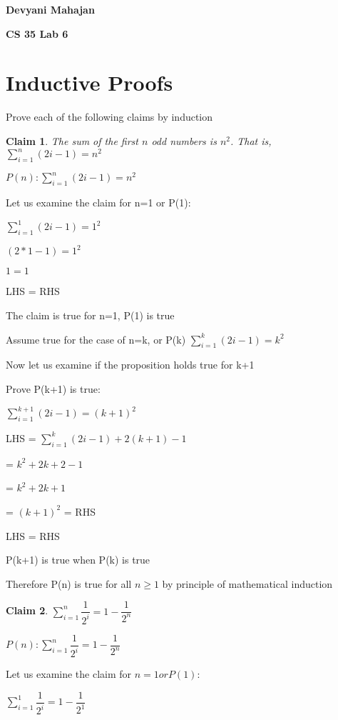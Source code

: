 \documentclass{article}
\newtheorem{claim}{Claim}
\begin{document}
\textbf{Devyani Mahajan}

\textbf{CS 35 Lab 6}
    \section{Inductive Proofs}

    Prove each of the following claims by induction

    \begin{claim}
      The sum of the first $n$ odd numbers is $n^2$.  That is, $\sum\limits_{i=1}^n (2i-1) = n^2$
    \end{claim}

	$P(n): \sum\limits_{i=1}^n (2i-1) = n^2$

    Let us examine the claim for n=1 or P(1):

    $\sum\limits_{i=1}^1 (2i-1) = 1^2$

    $(2*1 -1) = 1^2$

    $1 = 1$

    LHS = RHS

    The claim is true for n=1, P(1) is true


    Assume true for the case of n=k, or P(k)
    $\sum\limits_{i=1}^k (2i-1) = k^2$


    Now let us examine if the proposition holds true for k+1

    Prove P(k+1) is true:

    $\sum\limits_{i=1}^{k+1} (2i-1) = (k+1)^2$

    LHS = $\sum\limits_{i=1}^k (2i-1)+2(k+1)-1$

    = $k^2+2k+2-1$

    = $k^2+2k+1$

    = $(k+1)^2$ = RHS

    LHS = RHS

    P(k+1) is true when P(k) is true


    Therefore P(n) is true for all $n \geq 1$ by principle of mathematical induction



    \begin{claim}
      $\sum\limits_{i=1}^{n} \dfrac{1}{2^i} = 1 - \dfrac{1}{2^n}$
    \end{claim}

    $P(n): \sum\limits_{i=1}^{n} \dfrac{1}{2^i} = 1 - \dfrac{1}{2^n}$

    Let us examine the claim for $n=1 or P(1):$
    
    $\sum\limits_{i=1}^{1} \dfrac{1}{2^i} = 1 - \dfrac{1}{2^1}$
    
\end{document}
